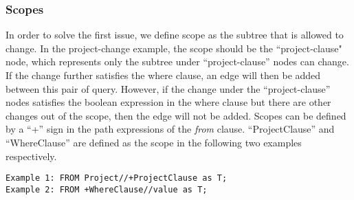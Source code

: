 \subsubsection{Scopes}
In order to solve the first issue, we define scope as the subtree that is allowed to change. In the project-change example, the scope should be the ``project-clause" node, which represents only the subtree under ``project-clause'' nodes can change. If the change further satisfies the where clause, an edge will then be added between this pair of query. However, if the change under the ``project-clause'' nodes  satisfies the boolean expression in the where clause but there are other changes out of the scope, then the edge will not be added. Scopes can be defined by a ``+'' sign in the path expressions of the \emph{from} clause. ``ProjectClause'' and ``WhereClause'' are defined as the scope in the following two examples respectively.
\begin{verbatim}
Example 1: FROM Project//+ProjectClause as T;
Example 2: FROM +WhereClause//value as T;
\end{verbatim}
